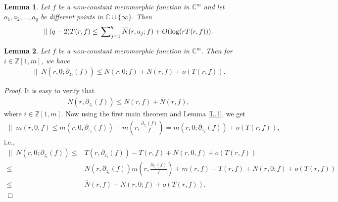 \documentclass[11pt, reqno]{amsart}
\newtheorem{lem}{Lemma}[section]
\newcommand{\ol}{\overline}
\numberwithin{equation}{section}
\begin{document}
\begin{lem}\label{L.2}\cite[Lemma 1.2]{hy2} Let $f$ be a non-constant meromorphic function in $\mathbb{C}^m$ and let $a_1,a_2,\ldots,a_q$ be different points in $\mathbb{C}\cup\{\infty\}$. Then
\begin{align*}
 \parallel (q-2)T(r,f)\leq \sideset{}{_{j=1}^{q}}{\sum} \ol N(r,a_j;f)+O(\log (rT(r,f))).
 \end{align*}
\end{lem}

\begin{lem}\label{L.6} Let $f$ be a non-constant meromorphic function in $\mathbb{C}^m$. Then for $i\in\mathbb{Z}[1,m]$, we have
\begin{align*}
\parallel\;N(r,0;\partial_{z_i}(f))\leq N(r,0;f)+\ol N(r,f)+o(T(r,f)).
\end{align*}
\end{lem}
\begin{proof} It is easy to verify that
\begin{align*}
N(r,\partial_{z_i}(f))\leq N(r,f)+\ol N(r,f),
\end{align*}
where $i\in\mathbb{Z}[1,m]$. Now using the first main theorem and Lemma \ref{L.1}, we get
\begin{align*} \parallel\;m(r,0,f)\leq m(r,0,\partial_{z_i}(f))+m\left(r,\frac{\partial_{z_i}(f)}{f}\right)=m(r,0;\partial_{z_i}(f))+o(T(r,f)),
\end{align*}
i.e.,
\begin{align*}
 \parallel\; N(r,0;\partial_{z_i}(f))\leq& T(r,\partial_{z_i}(f))-T(r,f)+N(r,0,f)+o(T(r,f))\\\leq&
N(r,\partial_{z_i}(f))m\left(r,\frac{\partial_{z_i}(f)}{f}\right)+m(r,f)-T(r,f)+N(r,0;f)+o(T(r,f))\\\leq& \ol N(r,f)+N(r,0;f)+o(T(r,f)).
\end{align*}
\end{proof}
\end{document}

